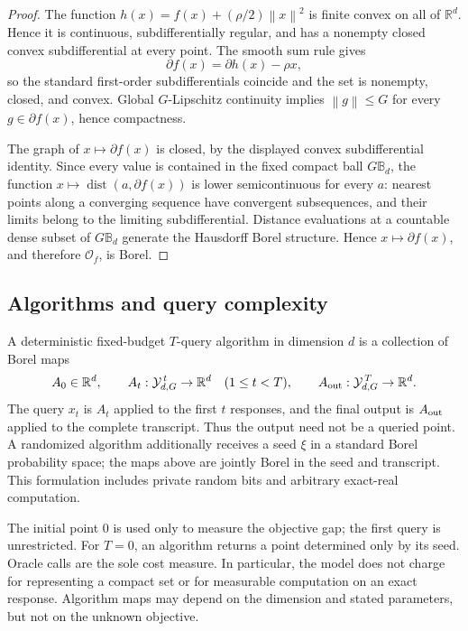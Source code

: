 \documentclass[11pt,a4paper]{article}
\newcommand{\R}{\mathbb{R}}
\newcommand{\norm}[1]{\left\lVert #1\right\rVert}
\newcommand{\cO}{\mathcal O}
\newcommand{\cY}{\mathcal Y}
\DeclareMathOperator{\dist}{dist}
\theoremstyle{definition}
\numberwithin{equation}{section}
\begin{document}
\begin{proof}
The function $h(x)=f(x)+(\rho/2)\norm{x}^2$ is finite convex on all of $\R^d$.  Hence it is continuous, subdifferentially regular, and has a nonempty closed convex subdifferential at every point.  The smooth sum rule gives
\[
 \partial f(x)=\partial h(x)-\rho x,
\]
so the standard first-order subdifferentials coincide and the set is nonempty, closed, and convex.  Global $G$-Lipschitz continuity implies $\norm g\le G$ for every $g\in\partial f(x)$, hence compactness.

The graph of $x\mapsto\partial f(x)$ is closed, by the displayed convex
subdifferential identity. Since every value is contained in the fixed
compact ball $G\mathbb B_d$, the function
$x\mapsto\dist(a,\partial f(x))$ is lower semicontinuous for every $a$:
nearest points along a converging sequence have convergent subsequences,
and their limits belong to the limiting subdifferential. Distance
evaluations at a countable dense subset of $G\mathbb B_d$ generate the
Hausdorff Borel structure. Hence $x\mapsto\partial f(x)$, and therefore
$\cO_f$, is Borel.
\end{proof}

\subsection{Algorithms and query complexity}

A deterministic fixed-budget $T$-query algorithm in dimension $d$ is a collection of Borel maps
\[
 A_0\in\R^d,
 \qquad
 A_t:\cY_{d,G}^{\,t}\to\R^d\quad(1\le t<T),
 \qquad
 A_{\rm out}:\cY_{d,G}^{\,T}\to\R^d.
\]
The query $x_t$ is $A_t$ applied to the first $t$ responses, and the final output is $A_{\rm out}$ applied to the complete transcript.  Thus the output need not be a queried point.  A randomized algorithm additionally receives a seed $\xi$ in a standard Borel probability space; the maps above are jointly Borel in the seed and transcript.  This formulation includes private random bits and arbitrary exact-real computation.

The initial point $0$ is used only to measure the objective gap; the first
query is unrestricted. For $T=0$, an algorithm returns a point determined
only by its seed. Oracle calls are the sole cost measure. In particular,
the model does not charge for representing a compact set or for measurable
computation on an exact response. Algorithm maps may depend on the dimension
and stated parameters, but not on the unknown objective.
\end{document}
